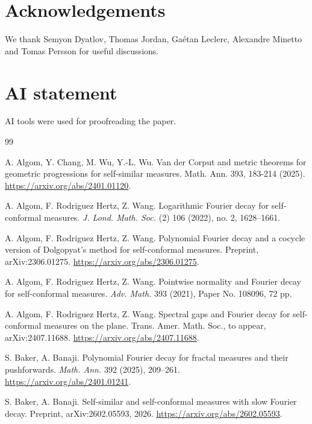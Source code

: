 \documentclass[12pt]{amsart}
\theoremstyle{definition}
\begin{document}
\section*{Acknowledgements} We thank Semyon Dyatlov, Thomas Jordan, Gaétan Leclerc, Alexandre Minetto and Tomas Persson for useful discussions. 

\section*{AI statement} AI tools were used for proofreading the paper.



\begin{thebibliography}{99}

A. Algom, Y. Chang, M. Wu, Y.-L. Wu.
\newblock Van der Corput and metric theorems for geometric progressions for self-similar measures.
\newblock Math. Ann. 393, 183-214 (2025).
\newblock \url{https://arxiv.org/abs/2401.01120}.

A. Algom, F. Rodriguez Hertz, Z. Wang.
\newblock Logarithmic Fourier decay for self-conformal measures.
\newblock \emph{J. Lond. Math. Soc.} (2) 106 (2022), no. 2, 1628--1661.

A. Algom, F. Rodriguez Hertz, Z. Wang.
\newblock Polynomial Fourier decay and a cocycle version of Dolgopyat's method for self-conformal measures.
\newblock Preprint, arXiv:2306.01275.
\newblock \url{https://arxiv.org/abs/2306.01275}.

A. Algom, F. Rodriguez Hertz, Z. Wang.
\newblock Pointwise normality and Fourier decay for self-conformal measures.
\newblock \emph{Adv. Math.} 393 (2021), Paper No. 108096, 72 pp.

A. Algom, F. Rodriguez Hertz, Z. Wang.
\newblock Spectral gaps and Fourier decay for self-conformal measures on the plane.
\newblock Trans. Amer. Math. Soc., to appear, arXiv:2407.11688.
\newblock \url{https://arxiv.org/abs/2407.11688}.

S. Baker, A. Banaji.
\newblock Polynomial Fourier decay for fractal measures and their pushforwards.
\newblock \emph{Math. Ann.} 392 (2025), 209--261.
\newblock \url{https://arxiv.org/abs/2401.01241}.

S. Baker, A. Banaji.
\newblock Self-similar and self-conformal measures with slow Fourier decay.
\newblock Preprint, arXiv:2602.05593, 2026.
\newblock \url{https://arxiv.org/abs/2602.05593}.


\end{thebibliography}
\end{document}
